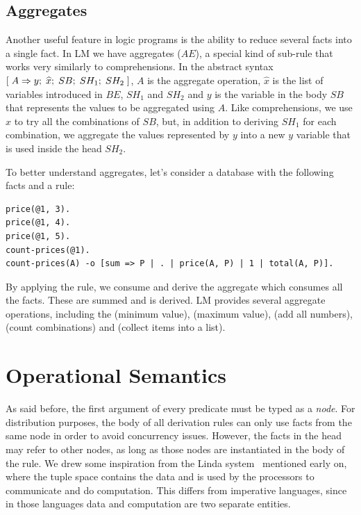 \subsection{Aggregates}

Another useful feature in logic programs is the ability to reduce several facts
into a single fact.  In LM we have aggregates ($AE$), a special kind of sub-rule
that works very similarly to comprehensions.  In the abstract syntax
$[\; A \Rightarrow y; \; \widehat{x}; \; SB; \; SH_1; \; SH_2 \;]$, $A$ is the aggregate operation,
$\widehat{x}$ is the list of variables introduced in $BE$, $SH_1$ and $SH_2$
and $y$ is the variable in the body $SB$ that represents the values to be
aggregated using $A$. Like comprehensions, we use $\widehat{x}$ to try all
the combinations of $SB$, but, in addition to deriving $SH_1$ for each
combination, we aggregate the values represented by $y$ into a new $y$
variable that is used inside the head $SH_2$.

To better understand aggregates, let's consider a database with the following
facts and a rule:

\begin{Verbatim}[fontsize=\codesize]
price(@1, 3).
price(@1, 4).
price(@1, 5).
count-prices(@1).
count-prices(A) -o [sum => P | . | price(A, P) | 1 | total(A, P)].
\end{Verbatim}

By applying the rule, we consume  and derive the
aggregate which consumes all the  facts.  These are summed
and  is derived. LM provides several aggregate operations,
including the  (minimum value),  (maximum value),
 (add all numbers),  (count combinations) and
 (collect items into a list).

\section{Operational Semantics}

As said before, the first argument of every predicate must be typed as a
\emph{node}.  For distribution purposes, the body of all derivation rules can
only use facts from the same node in order to avoid concurrency issues.
However, the facts in the head may refer to other nodes, as long as those nodes
are instantiated in the body of the rule.  We drew some inspiration from the
Linda system~\cite{linda} mentioned early on, where the tuple space contains
the data and is used by the processors to communicate and do computation.  This
differs from imperative languages, since in those languages data and computation
are two separate entities.

